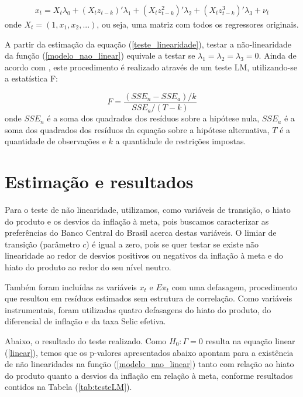 \documentclass[
	article,			%
	11pt,				%
	oneside,			%
	a4paper,			%
	english,			%
	brazil,				%
	]{abntex2}
\begin{document}
	\begin{eqnarray} \label{teste_linearidade}
		x_t =  X_t \lambda_0 + (X_t z_{t-k})' \lambda_1 + (X_t z_{t-k}^2)' \lambda_2 + (X_t z_{t-k}^3)' \lambda_3 + \nu_t
	\end{eqnarray}
	onde $X_t = (1, x_1, x_2, ...)$, ou seja, uma matriz com todos os regressores originais.
	
	A partir da estimação da equação (\ref{teste_linearidade}), testar a não-linearidade da função (\ref{modelo_nao_linear}) equivale a testar se $\lambda_1 = \lambda_2 = \lambda_3 = 0$. Ainda de acordo com , este procedimento é realizado através de um teste LM, utilizando-se a estatística F:
	
	\begin{equation} \label{estatistica_f}
		F = \frac{(SSE_n - SSE_a) / k}{SSE_a / (T - k)}
	\end{equation}
	onde $SSE_n$ é a soma dos quadrados dos resíduos sobre a hipótese nula, $SSE_a$ é a soma dos quadrados dos resíduos da equação sobre a hipótese alternativa, $T$ é a quantidade de observações e $k$ a quantidade de restrições impostas.
	
	
	
	\section{Estimação e resultados}
	
	Para o teste de não linearidade, utilizamos, como variáveis de transição, o hiato do produto e os desvios da inflação à meta, pois buscamos caracterizar as preferências do Banco Central do Brasil acerca destas variáveis. O limiar de transição (parâmetro $c$) é igual a zero, pois se quer testar se existe não linearidade ao redor de desvios positivos ou negativos da inflação à meta e do hiato do produto ao redor do seu nível neutro. 
	
	Também foram incluídas as variáveis $x_t$ e $E\pi_t$ com uma defasagem, procedimento que resultou em resíduos estimados sem estrutura de correlação. Como variáveis instrumentais, foram utilizadas quatro defasagens do hiato do produto, do diferencial de inflação e da taxa Selic efetiva.
	
	Abaixo, o resultado do teste realizado. Como $H_0: \Gamma = 0$ resulta na equação linear (\ref{linear}), temos que os p-valores apresentados abaixo apontam para a existência de não linearidades na função (\ref{modelo_nao_linear}) tanto com relação ao hiato do produto quanto a desvios da inflação em relação à meta, conforme resultados contidos na Tabela (\ref{tab:testeLM}). 
	
\end{document}
